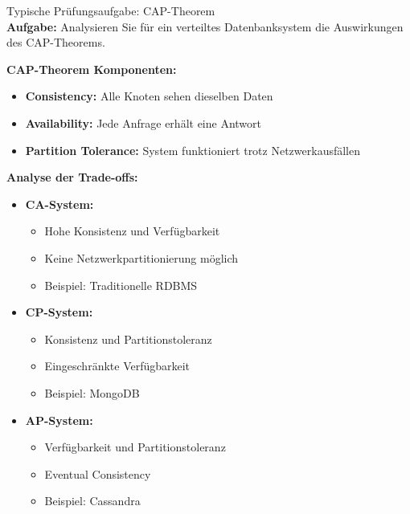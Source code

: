 \begin{example2}{Typische Prüfungsaufgabe: CAP-Theorem}\\
\textbf{Aufgabe:}
Analysieren Sie für ein verteiltes Datenbanksystem die Auswirkungen des CAP-Theorems.

\textbf{CAP-Theorem Komponenten:}
\begin{itemize}
    \item \textbf{Consistency:} Alle Knoten sehen dieselben Daten
    \item \textbf{Availability:} Jede Anfrage erhält eine Antwort
    \item \textbf{Partition Tolerance:} System funktioniert trotz Netzwerkausfällen
\end{itemize}

\textbf{Analyse der Trade-offs:}
\begin{itemize}
    \item \textbf{CA-System:}
    \begin{itemize}
        \item Hohe Konsistenz und Verfügbarkeit
        \item Keine Netzwerkpartitionierung möglich
        \item Beispiel: Traditionelle RDBMS
    \end{itemize}
    \item \textbf{CP-System:}
    \begin{itemize}
        \item Konsistenz und Partitionstoleranz
        \item Eingeschränkte Verfügbarkeit
        \item Beispiel: MongoDB
    \end{itemize}
    \item \textbf{AP-System:}
    \begin{itemize}
        \item Verfügbarkeit und Partitionstoleranz
        \item Eventual Consistency
        \item Beispiel: Cassandra
    \end{itemize}
\end{itemize}
\end{example2}


